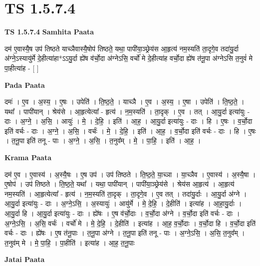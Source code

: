 \documentclass[17pt]{extarticle}
\begin{document}
\section*{ TS 1.5.7.4 }

\textbf{TS 1.5.7.4 } \newline
\textbf{Samhita Paata} \newline

दम॑ ए॒वास्यै॒ष उप॑ तिष्ठते याच्ञैवास्यै॒षोप॑ तिष्ठते॒ यथा॒ पापी॑या॒ञ्छ्रेय॑स आ॒हृत्य॑ नम॒स्यति॑ ता॒दृगे॒व तदा॑यु॒र्दा अ॑ग्ने॒ऽस्यायु॑र्मे दे॒हीत्या॑हा*ऽऽयु॒र्दा ह्ये॑ष व॑र्चो॒दा अ॑ग्नेऽसि॒ वर्चो॑ मे दे॒हीत्या॑ह वर्चो॒दा ह्ये॑ष त॑नू॒पा अ॑ग्नेऽसि त॒नुवं॑ मे पा॒हीत्या॑ह - [ ] \newline

\textbf{Pada Paata} \newline

दमः॑ । ए॒व । अ॒स्य॒ । ए॒षः । उपेति॑ । ति॒ष्ठ॒ते॒ । याच्ञै । ए॒व । अ॒स्य॒ । ए॒षा । उपेति॑ । ति॒ष्ठ॒ते॒ । यथा᳚ । पापी॑यान् । श्रेय॑से । आ॒हृत्येत्या᳚ - हृत्य॑ । न॒म॒स्यति॑ । ता॒दृक् । ए॒व । तत् । आ॒यु॒र्दा इत्या॑युः - दाः । अ॒ग्ने॒ । अ॒सि॒ । आयुः॑ । मे॒ । दे॒हि॒ । इति॑ । आ॒ह॒ । आ॒यु॒र्दा इत्या॑युः - दाः । हि । ए॒षः । व॒र्चो॒दा इति॑ वर्चः - दाः । अ॒ग्ने॒ । अ॒सि॒ । वर्चः॑ । मे॒ । दे॒हि॒ । इति॑ । आ॒ह॒ । व॒र्चो॒दा इति॑ वर्चः - दाः । हि । ए॒षः । त॒नू॒पा इति॑ तनू - पाः । अ॒ग्ने॒ । अ॒सि॒ । त॒नुव᳚म् । मे॒ । पा॒हि॒ । इति॑ । आ॒ह॒ ।  \newline


\textbf{Krama Paata} \newline

दम॑ ए॒व । ए॒वास्य॑ । अ॒स्यै॒षः । ए॒ष उप॑ । उप॑ तिष्ठते । ति॒ष्ठ॒ते॒ या॒च्ञा । या॒च्ञैव । ए॒वास्य॑ । अ॒स्यै॒षा । ए॒षोप॑ । उप॑ तिष्ठते । ति॒ष्ठ॒ते॒ यथा᳚ । यथा॒ पापी॑यान् । पापी॑या॒ञ्छ्रेय॑से । श्रेय॑स आ॒हृत्य॑ । आ॒हृत्य॑ नम॒स्यति॑ । आ॒हृत्येत्या᳚ - हृत्य॑ । न॒म॒स्यति॑ ता॒दृक् । ता॒दृगे॒व । ए॒व तत् । तदा॑यु॒र्दाः । आ॒यु॒र्दा अ॑ग्ने । आ॒यु॒र्दा इत्या॑युः - दाः । अ॒ग्ने॒ऽसि॒ । अ॒स्यायुः॑ । आयु॑र्मे । मे॒ दे॒हि॒ । दे॒हीति॑ । इत्या॑ह । आ॒हा॒यु॒र्दाः । आ॒यु॒र्दा हि । आ॒यु॒र्दा इत्या॑युः - दाः । ह्ये॑षः । ए॒ष व॑र्चो॒दाः । व॒र्चो॒दा अ॑ग्ने । व॒र्चो॒दा इति॑ वर्चः - दाः । अ॒ग्ने॒ऽसि॒ । अ॒सि॒ वर्चः॑ । वर्चो॑ मे । मे॒ दे॒हि॒ । दे॒हीति॑ । इत्या॑ह । आ॒ह॒ व॒र्चो॒दाः । व॒र्चो॒दा हि । व॒र्चो॒दा इति॑ वर्चः - दाः । ह्ये॑षः । ए॒ष त॑नू॒पाः । त॒नू॒पा अ॑ग्ने । त॒नू॒पा इति॑ तनू - पाः । अ॒ग्ने॒ऽसि॒ । अ॒सि॒ त॒नुव᳚म् । त॒नुव॑म् मे । मे॒ पा॒हि॒ । पा॒हीति॑ । इत्या॑ह । आ॒ह॒ त॒नू॒पाः \newline

\textbf{Jatai Paata} \newline
\end{document}
